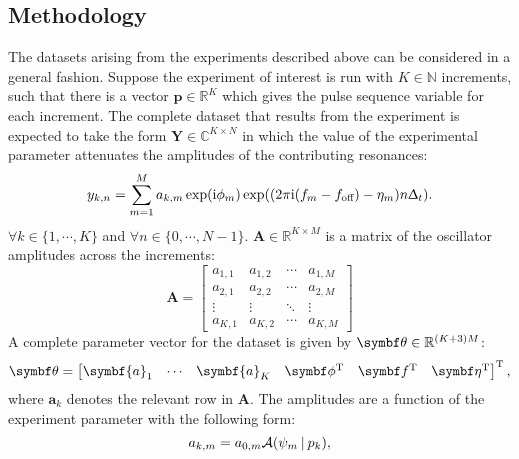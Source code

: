 
\subsection{Methodology}
The datasets arising from the experiments described above can be considered in
a general fashion.
Suppose the experiment of interest is run with $K \in \mathbb{N}$ increments,
such that there is a vector  $\symbf{p} \in \mathbb{R}^K$ which gives the
pulse sequence variable for each increment.
The complete dataset that results from the experiment is expected to take the
form $\symbf{Y} \in \mathbb{C}^{K \times N}$ in which the value of the
experimental parameter attenuates the amplitudes of the contributing
resonances:
\begin{equation}
    y_{k,n} = \sum_{m=1}^{M} a_{k,m} \exp(\mathrm{i} \phi_m)
    \exp((2 \pi \mathrm{i} (f_m - f_{\text{off}}) - \eta_m) n \Updelta_t).
\end{equation}
$\forall k \in \lbrace 1, \cdots, K \rbrace$ and $\forall n \in \lbrace 0,
\cdots, N-1 \rbrace$.
$\symbf{A} \in \mathbb{R}^{K \times M}$ is a matrix of the oscillator amplitudes
across the increments:
\begin{equation}
    \symbf{A} =
    \begin{bmatrix}
        a_{1,1} & a_{1,2} & \cdots & a_{1,M}\\
        a_{2,1} & a_{2,2} & \cdots & a_{2,M}\\
        \vdots & \vdots & \ddots & \vdots\\
        a_{K,1} & a_{K,2} & \cdots & a_{K,M}
    \end{bmatrix}
\end{equation}
A complete parameter vector for the dataset is given by $\bth \in
\mathbb{R}^{(K + 3)M}$:
\begin{equation}
    \bth =
    \begin{bmatrix}
        \symbf{a}_1 & \cdots & \symbf{a}_K & \bdphi\T & \bdf\T & \bdeta\T
    \end{bmatrix}\T,
\end{equation}
where $\symbf{a}_k$ denotes the relevant row in $\symbf{A}$.
The amplitudes are a function of the experiment parameter with the following
form:
\begin{equation}
    a_{k,m} = a_{0,m} \mathcal{A} (\psi_m \hspace*{2pt} | \hspace*{2pt} p_k),
\end{equation}
